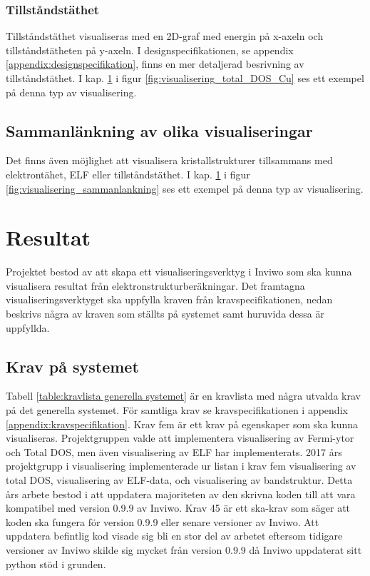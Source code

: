 \documentclass[a4paper,12pt,twoside,openright]{report}
\begin{document}
\subsubsection{Tillståndstäthet}
Tillståndstäthet visualiseras med en 2D-graf med energin på x-axeln och tillståndstätheten på y-axeln. 
I designspecifikationen, se appendix \ref{appendix:designspecifikation}, finns en mer detaljerad besrivning av tillståndstäthet. I kap. \ref{ch:resultat} i figur \ref{fig:visualisering_total_DOS_Cu} ses ett exempel på denna typ av visualisering.

\subsection{Sammanlänkning av olika visualiseringar}
Det finns även möjlighet att visualisera kristallstrukturer tillsammans med elektrontähet, ELF eller tillståndstäthet. I kap. \ref{ch:resultat} i figur \ref{fig:visualisering_sammanlankning} ses ett exempel på denna typ av visualisering.


\section{Resultat}
\label{ch:resultat}
Projektet bestod av att skapa ett visualiseringsverktyg i Inviwo som ska kunna visualisera resultat från elektronstrukturberäkningar. Det framtagna visualiseringsverktyget ska uppfylla kraven från kravspecifikationen, nedan beskrivs några av kraven som ställts på systemet samt huruvida dessa är uppfyllda.

\subsection{Krav på systemet}
Tabell \ref{table:kravlista generella systemet} är en kravlista med några utvalda krav på det generella systemet. För samtliga krav se kravspecifikationen i appendix \ref{appendix:kravspecifikation}. Krav fem är ett krav på egenskaper som ska kunna visualiseras. Projektgruppen valde att implementera visualisering av Fermi-ytor och Total DOS, men även visualisering av ELF har implementerats. 2017 års projektgrupp i visualisering implementerade ur listan i krav fem visualisering av total DOS, visualisering av ELF-data, och visualisering av bandstruktur. Detta års arbete bestod i att uppdatera majoriteten av den skrivna koden till att vara kompatibel med version 0.9.9 av Inviwo. Krav 45 är ett ska-krav som säger att koden ska fungera för version 0.9.9 eller senare versioner av Inviwo. Att uppdatera befintlig kod visade sig bli en stor del av arbetet eftersom tidigare versioner av Inviwo skilde sig mycket från version 0.9.9 då Inviwo uppdaterat sitt python stöd i grunden.
 
\end{document}
